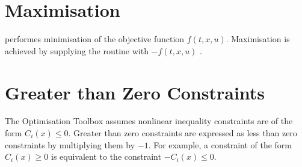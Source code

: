 \section{Maximisation}
\label{sec:maximisation}

 performes minimisation of the objective
function $f(t,x,u)$. Maximisation is achieved by supplying the
routine with $-f(t,x,u)$ . 

\section{Greater than Zero Constraints}
\label{sec:zeroconstraints}

The Optimisation Toolbox assumes nonlinear inequality constraints are
of the form $C_{i}(x)\leq 0$. Greater than zero constraints are
expressed as less than zero constraints by multiplying them by $-1$. For
example, a constraint of the form $C_{i}(x)\geq 0$ is equivalent to the
constraint $-C_{i}(x)\leq 0$. 



